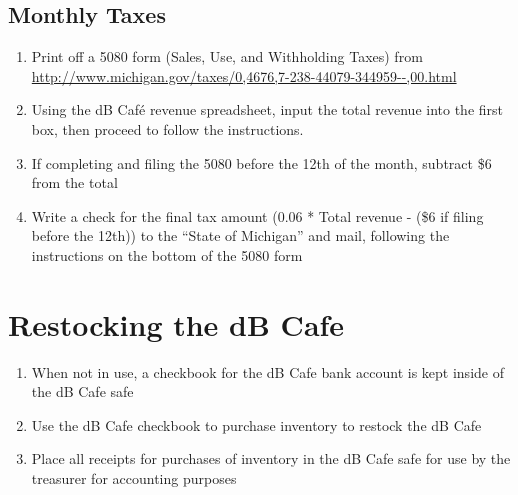\documentclass[12pt,onecolumn,letterpaper]{article}
\begin{document}
\subsection{Monthly Taxes}
\begin{enumerate}
\item Print off a 5080 form (Sales, Use, and Withholding Taxes) from \url{http://www.michigan.gov/taxes/0,4676,7-238-44079-344959--,00.html}
\item Using the dB Café revenue spreadsheet, input the total revenue into the first box, then proceed to follow the instructions.
\item If completing and filing the 5080 before the 12th of the month, subtract \$6 from the total
\item Write a check for the final tax amount (0.06 * Total revenue - (\$6 if filing before the 12th)) to the ``State of Michigan'' and mail, following the instructions on the bottom of the 5080 form
\end{enumerate}
\section{Restocking the dB Cafe}
\begin{enumerate}
\item When not in use, a checkbook for the dB Cafe bank account is kept inside of the dB Cafe safe
\item Use the dB Cafe checkbook to purchase inventory to restock the dB Cafe
\item Place all receipts for purchases of inventory in the dB Cafe safe for use by the treasurer for accounting purposes
\end{enumerate}
\end{document}
